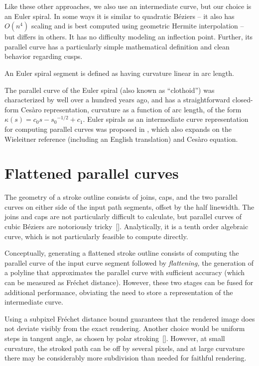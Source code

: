 \documentclass[sigconf, nonacm]{acmart}
\begin{document}
Like these other approaches, we also use an intermediate curve, but our choice is an Euler spiral. In some ways it is similar to quadratic Béziers -- it also has $O(n^4)$ scaling and is best computed using geometric Hermite interpolation -- but differs in others. It has no difficulty modeling an inflection point. Further, its parallel curve has a particularly simple mathematical definition and clean behavior regarding cusps.

An Euler spiral segment is defined as having curvature linear in arc length.

The parallel curve of the Euler spiral (also known as ``clothoid'') was characterized by \citet{Wieleitner1907} well over a hundred years ago, and has a straightforward closed-form Cesàro representation, curvature as a function of arc length, of the form $\kappa(s) = c_0{s - s_0}^{-1/2} + c_1$. Euler spirals as an intermediate curve representation for computing parallel curves was proposed in \citet{Levien2021}, which also expands on the Wieleitner reference (including an English translation) and Cesàro equation.

\section{Flattened parallel curves}

The geometry of a stroke outline consists of joins, caps, and the two parallel curves on either side of the input path segments, offset by the half linewidth. The joins and caps are not particularly difficult to calculate, but parallel curves of cubic Béziers are notoriously tricky~[]. Analytically, it is a tenth order algebraic curve, which is not particularly feasible to compute directly.

Conceptually, generating a flattened stroke outline consists of computing the parallel curve of the input curve segment followed by \emph{flattening,} the generation of a polyline that approximates the parallel curve with sufficient accuracy (which can be measured as Fréchet distance). However, these two stages can be fused for additional performance, obviating the need to store a representation of the intermediate curve.

Using a subpixel Fréchet distance bound guarantees that the rendered image does not deviate visibly from the exact rendering. Another choice would be uniform steps in tangent angle, as chosen by polar stroking~[]. However, at small curvature, the stroked path can be off by several pixels, and at large curvature there may be considerably more subdivision than needed for faithful rendering.
\end{document}
